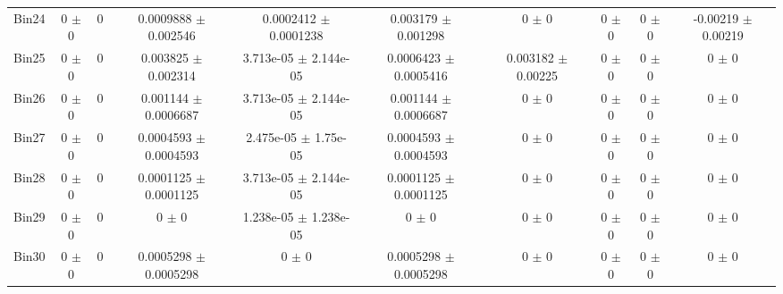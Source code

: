 \begin{tabular}{@{\extracolsep{4pt}}lccccccccc@{}}
     Bin24 & 0 $\pm$ 0 & 0 & 0.0009888 $\pm$ 0.002546 & 0.0002412 $\pm$ 0.0001238 & 0.003179 $\pm$ 0.001298 & 0 $\pm$ 0 & 0 $\pm$ 0 & 0 $\pm$ 0 & -0.00219 $\pm$ 0.00219 \\ 
     Bin25 & 0 $\pm$ 0 & 0 & 0.003825 $\pm$ 0.002314 & 3.713e-05 $\pm$ 2.144e-05 & 0.0006423 $\pm$ 0.0005416 & 0.003182 $\pm$ 0.00225 & 0 $\pm$ 0 & 0 $\pm$ 0 & 0 $\pm$ 0 \\ 
     Bin26 & 0 $\pm$ 0 & 0 & 0.001144 $\pm$ 0.0006687 & 3.713e-05 $\pm$ 2.144e-05 & 0.001144 $\pm$ 0.0006687 & 0 $\pm$ 0 & 0 $\pm$ 0 & 0 $\pm$ 0 & 0 $\pm$ 0 \\ 
     Bin27 & 0 $\pm$ 0 & 0 & 0.0004593 $\pm$ 0.0004593 & 2.475e-05 $\pm$ 1.75e-05 & 0.0004593 $\pm$ 0.0004593 & 0 $\pm$ 0 & 0 $\pm$ 0 & 0 $\pm$ 0 & 0 $\pm$ 0 \\ 
     Bin28 & 0 $\pm$ 0 & 0 & 0.0001125 $\pm$ 0.0001125 & 3.713e-05 $\pm$ 2.144e-05 & 0.0001125 $\pm$ 0.0001125 & 0 $\pm$ 0 & 0 $\pm$ 0 & 0 $\pm$ 0 & 0 $\pm$ 0 \\ 
     Bin29 & 0 $\pm$ 0 & 0 & 0 $\pm$ 0 & 1.238e-05 $\pm$ 1.238e-05 & 0 $\pm$ 0 & 0 $\pm$ 0 & 0 $\pm$ 0 & 0 $\pm$ 0 & 0 $\pm$ 0 \\ 
     Bin30 & 0 $\pm$ 0 & 0 & 0.0005298 $\pm$ 0.0005298 & 0 $\pm$ 0 & 0.0005298 $\pm$ 0.0005298 & 0 $\pm$ 0 & 0 $\pm$ 0 & 0 $\pm$ 0 & 0 $\pm$ 0 \\ 
\hline\hline
  \end{tabular}
